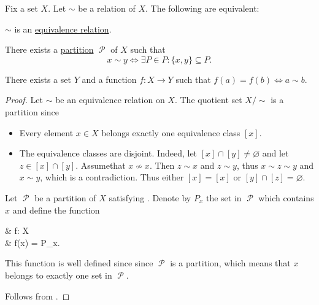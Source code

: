 \begin{proposition}\label{thm:equivalence_partition}
  Fix a set \( X \). Let \( \sim \) be a relation of \( X \). The following are equivalent:
  \begin{thmenum}
     \( \sim \) is an \hyperref[def:equivalence_relation]{equivalence relation}.

     There exists a \hyperref[def:set_partition]{partition} \( \mscrP \) of \( X \) such that
    \begin{equation}\label{thm:equivalence_partition/partition/property}
      x \sim y \iff \exists P \in P: \{ x, y \} \subseteq P.
    \end{equation}

     There exists a set \( Y \) and a function \( f: X \to Y \) such that \( f(a) = f(b) \iff a \sim b \).
  \end{thmenum}
\end{proposition}
\begin{proof}
   Let \( \sim \) be an equivalence relation on \( X \). The quotient set \( X / \sim \) is a partition since
  \begin{itemize}
    \item Every element \( x \in X \) belongs exactly one equivalence class \( [x] \).
    \item The equivalence classes are disjoint. Indeed, let \( [x] \cap [y] \neq \varnothing \) and let \( z \in [x] \cap [y] \). Assume\DNE that \( x \not\sim x \). Then \( z \sim x \) and \( z \sim y \), thus \( x \sim z \sim y \) and \( x \sim y \), which is a contradiction. Thus either \( [x] = [x] \) or \( [y] \cap [z] = \varnothing \).
  \end{itemize}

   Let \( \mscrP \) be a partition of \( X \) satisfying . Denote by \( P_x \) the set in \( \mscrP \) which contains \( x \) and define the function
  \begin{balign*}
     & f: X \to \mscrP \\
     & f(x) = P_x.
  \end{balign*}

  This function is well defined since since \( \mscrP \) is a partition, which means that \( x \) belongs to exactly one set in \( \mscrP \).

   Follows from .
\end{proof}
